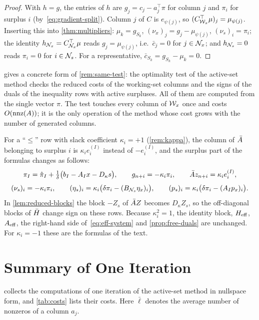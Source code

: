 \begin{proof}
With $h = g$, the entries of $h$ are $g_j = c_j - a_j^\top\pi$ for column $j$ and $\pi_i$ for
surplus $i$ (by~\eqref{eq:gradient-split}). Column $j$ of $C$ is $e_{\psi(j)}$, so
$(C_{\mathcal{W}_x}^\top\mu)_j = \mu_{\psi(j)}$. Inserting this into \cref{thm:multipliers}:
$\mu_k = g_{S_k}$, $(\nu_x)_j = g_j - \mu_{\psi(j)}$, $(\nu_s)_i = \pi_i$; the identity
$h_{\mathcal{N}_x} = C_{\mathcal{N}_x}^\top\mu$ reads $g_j = \mu_{\psi(j)}$, i.e.\ $\bar c_j = 0$ for $j\in\mathcal{N}_x$; and
$h_{\mathcal{N}_s} = 0$ reads $\pi_i = 0$ for $i\in\mathcal{N}_s$. For a representative, $\bar c_{S_k} = g_{S_k} - \mu_k = 0$.
\end{proof}

 gives a concrete form of \cref{rem:same-test}: the optimality
test of the active-set method checks the reduced costs of the working-set columns and the
signs of the duals of the inequality rows with active surpluses. All of them are computed
from the single vector $\pi$. The test touches every column of $\mathcal{W}_x$ once and costs
$O(\operatorname{nnz}(A))$; it is the only operation of the method whose cost grows with the number of
generated columns.

\begin{remark}[``$\le$'' rows] \label{rem:kappa-summary}
For a ``$\le$'' row with slack coefficient $\kappa_i = +1$ (\cref{rem:kappa}), the column of
$\bar{A}$ belonging to surplus $i$ is $\kappa_ie_i^{(I)}$ instead of $-e_i^{(I)}$, and the surplus
part of the formulas changes as follows:
\[
\pi_I = \hat{\pi}_I + \tfrac{1}{\delta}\bigl(b_I - A_Ix - D_\kappa s\bigr),\qquad
g_{n+i} = -\kappa_i\pi_i,\qquad
\bar{A} z_{n+i} = \kappa_ie_i^{(I)},
\]
\[
(\nu_s)_i = -\kappa_i\pi_i,\qquad
(\eta_s)_i = \kappa_i\bigl(\delta\pi_i - (B_{\mathcal{N}_s}\eta_x)_i\bigr),\qquad
(p_s)_i = \kappa_i\bigl(\delta\pi_i - (A_Ip_x)_i\bigr).
\]
In \cref{lem:reduced-blocks} the block $-Z_s$ of $\bar{A} Z$ becomes $D_\kappa Z_s$, so the
off-diagonal blocks of $\bar{H}$ change sign on these rows. Because $\kappa_i^2 = 1$, the identity
block, $H_{\mathrm{eff}}$, $A_{\mathrm{eff}}$, the right-hand side of~\eqref{eq:eff-system} and
\cref{prop:free-duals} are unchanged. For $\kappa_i = -1$ these are the formulas of the text.
\end{remark}


\section{Summary of One Iteration}
\label{sec:iteration-summary}

 collects the computations of one iteration of the active-set
method in nullspace form, and \cref{tab:costs} lists their costs. Here $\bar\ell$ denotes the
average number of nonzeros of a column $a_j$.

